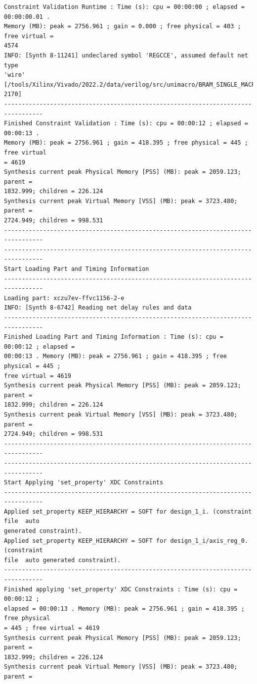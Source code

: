 \documentclass{article}
\begin{document}
\begin{lstlisting}
Constraint Validation Runtime : Time (s): cpu = 00:00:00 ; elapsed = 00:00:00.01 . 
Memory (MB): peak = 2756.961 ; gain = 0.000 ; free physical = 403 ; free virtual = 
4574
INFO: [Synth 8-11241] undeclared symbol 'REGCCE', assumed default net type 
'wire' [/tools/Xilinx/Vivado/2022.2/data/verilog/src/unimacro/BRAM_SINGLE_MACRO.v:
2170]
---------------------------------------------------------------------------------
Finished Constraint Validation : Time (s): cpu = 00:00:12 ; elapsed = 00:00:13 . 
Memory (MB): peak = 2756.961 ; gain = 418.395 ; free physical = 445 ; free virtual 
= 4619
Synthesis current peak Physical Memory [PSS] (MB): peak = 2059.123; parent = 
1832.999; children = 226.124
Synthesis current peak Virtual Memory [VSS] (MB): peak = 3723.480; parent = 
2724.949; children = 998.531
---------------------------------------------------------------------------------
---------------------------------------------------------------------------------
Start Loading Part and Timing Information
---------------------------------------------------------------------------------
Loading part: xczu7ev-ffvc1156-2-e
INFO: [Synth 8-6742] Reading net delay rules and data
---------------------------------------------------------------------------------
Finished Loading Part and Timing Information : Time (s): cpu = 00:00:12 ; elapsed = 
00:00:13 . Memory (MB): peak = 2756.961 ; gain = 418.395 ; free physical = 445 ; 
free virtual = 4619
Synthesis current peak Physical Memory [PSS] (MB): peak = 2059.123; parent = 
1832.999; children = 226.124
Synthesis current peak Virtual Memory [VSS] (MB): peak = 3723.480; parent = 
2724.949; children = 998.531
---------------------------------------------------------------------------------
---------------------------------------------------------------------------------
Start Applying 'set_property' XDC Constraints
---------------------------------------------------------------------------------
Applied set_property KEEP_HIERARCHY = SOFT for design_1_i. (constraint file  auto 
generated constraint).
Applied set_property KEEP_HIERARCHY = SOFT for design_1_i/axis_reg_0. (constraint 
file  auto generated constraint).
---------------------------------------------------------------------------------
Finished applying 'set_property' XDC Constraints : Time (s): cpu = 00:00:12 ; 
elapsed = 00:00:13 . Memory (MB): peak = 2756.961 ; gain = 418.395 ; free physical 
= 445 ; free virtual = 4619
Synthesis current peak Physical Memory [PSS] (MB): peak = 2059.123; parent = 
1832.999; children = 226.124
Synthesis current peak Virtual Memory [VSS] (MB): peak = 3723.480; parent = 

\end{lstlisting}
\end{document}
